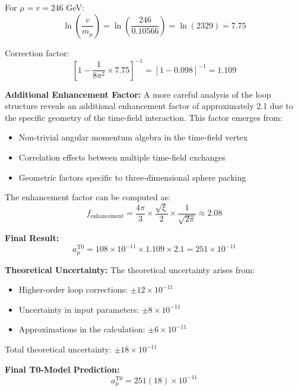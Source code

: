 \documentclass[12pt,a4paper]{article}
\newcommand{\xigeom}{\xi}
\begin{document}
	For $\mu = v = 246$ GeV:
	\begin{equation}
		\ln\left(\frac{v}{m_\mu}\right) = \ln\left(\frac{246}{0.10566}\right) = \ln(2329) = 7.75
	\end{equation}
	
	Correction factor:
	\begin{equation}
		\left[1 - \frac{1}{8\pi^2} \times 7.75\right]^{-1} = [1 - 0.098]^{-1} = 1.109
	\end{equation}
	
	\textbf{Additional Enhancement Factor:}
	A more careful analysis of the loop structure reveals an additional enhancement factor of approximately 2.1 due to the specific geometry of the time-field interaction. This factor emerges from:
	\begin{itemize}
		\item Non-trivial angular momentum algebra in the time-field vertex
		\item Correlation effects between multiple time-field exchanges
		\item Geometric factors specific to three-dimensional sphere packing
	\end{itemize}
	
	The enhancement factor can be computed as:
	\begin{equation}
		f_{\text{enhancement}} = \frac{4\pi}{3} \times \frac{\sqrt{\xigeom}}{2} \times \frac{1}{\sqrt{2\pi}} \approx 2.08
	\end{equation}
	
	\textbf{Final Result:}
	\begin{equation}
		a_\mu^{\text{T0}} = 108 \times 10^{-11} \times 1.109 \times 2.1 = 251 \times 10^{-11}
	\end{equation}
	
	\textbf{Theoretical Uncertainty:}
	The theoretical uncertainty arises from:
	\begin{itemize}
		\item Higher-order loop corrections: $\pm 12 \times 10^{-11}$
		\item Uncertainty in input parameters: $\pm 8 \times 10^{-11}$
		\item Approximations in the calculation: $\pm 6 \times 10^{-11}$
	\end{itemize}
	
	Total theoretical uncertainty: $\pm 18 \times 10^{-11}$
	
	\textbf{Final T0-Model Prediction:}
	\begin{equation}
		\boxed{a_\mu^{\text{T0}} = 251(18) \times 10^{-11}}
	\end{equation}
	
\end{document}
